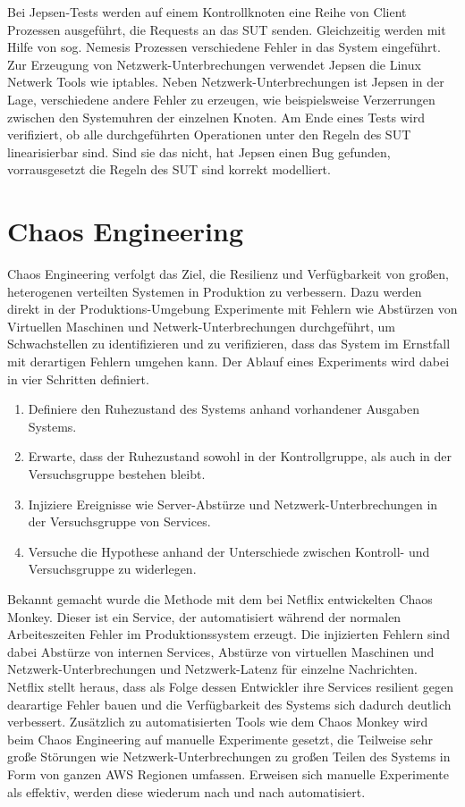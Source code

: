 \documentclass[12pt,a4paper]{report}
\begin{document}
Bei Jepsen-Tests werden auf einem Kontrollknoten eine Reihe von Client Prozessen ausgeführt, die Requests an das SUT senden.
Gleichzeitig werden mit Hilfe von sog. Nemesis Prozessen verschiedene Fehler in das System eingeführt. Zur Erzeugung von
Netzwerk-Unterbrechungen verwendet Jepsen die Linux Netwerk Tools wie iptables. Neben Netzwerk-Unterbrechungen ist Jepsen in
der Lage, verschiedene andere Fehler zu erzeugen, wie beispielsweise Verzerrungen zwischen den Systemuhren der einzelnen Knoten.
Am Ende eines Tests wird verifiziert, ob alle durchgeführten Operationen unter den Regeln des SUT linearisierbar sind. Sind sie das
nicht, hat Jepsen einen Bug gefunden, vorrausgesetzt die Regeln des SUT sind korrekt modelliert.

\section{Chaos Engineering}
Chaos Engineering verfolgt das Ziel, die Resilienz und Verfügbarkeit von großen, heterogenen verteilten Systemen in Produktion zu
verbessern. Dazu werden direkt in der Produktions-Umgebung Experimente mit Fehlern wie Abstürzen von Virtuellen Maschinen und
Netwerk-Unterbrechungen durchgeführt, um Schwachstellen zu identifizieren und zu verifizieren, dass das System im Ernstfall mit
derartigen Fehlern umgehen kann. Der Ablauf eines Experiments wird dabei in vier Schritten definiert.
\begin{enumerate}
    \item Definiere den Ruhezustand des Systems anhand vorhandener Ausgaben Systems.
    \item Erwarte, dass der Ruhezustand sowohl in der Kontrollgruppe, als auch in der Versuchsgruppe bestehen bleibt.
    \item Injiziere Ereignisse wie Server-Abstürze und Netzwerk-Unterbrechungen in der Versuchsgruppe von Services.
    \item Versuche die Hypothese anhand der Unterschiede zwischen Kontroll- und Versuchsgruppe zu widerlegen.
\end{enumerate}
Bekannt gemacht wurde die Methode mit dem bei Netflix entwickelten Chaos Monkey. Dieser ist ein Service, der automatisiert während
der normalen Arbeiteszeiten Fehler im Produktionssystem erzeugt. Die injizierten Fehlern sind dabei Abstürze von internen
Services, Abstürze von virtuellen Maschinen und Netzwerk-Unterbrechungen und Netzwerk-Latenz für einzelne Nachrichten. Netflix
stellt heraus, dass als Folge dessen Entwickler ihre Services resilient gegen dearartige Fehler bauen und die Verfügbarkeit des
Systems sich dadurch deutlich verbessert. Zusätzlich zu automatisierten Tools wie dem Chaos Monkey wird beim Chaos Engineering
auf manuelle Experimente gesetzt, die Teilweise sehr große Störungen wie Netzwerk-Unterbrechungen zu großen Teilen des Systems in
Form von ganzen AWS Regionen umfassen. Erweisen sich manuelle Experimente als effektiv, werden diese wiederum nach und nach
automatisiert.
\end{document}
